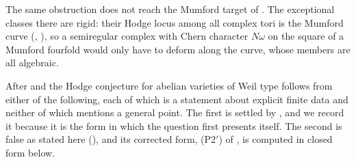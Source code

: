 \begin{remark}
The same obstruction does not reach the Mumford target of
. The exceptional classes there are rigid: their Hodge
locus among all complex tori is the Mumford curve (,
), so a semiregular complex with Chern character
$N\omega$ on the square of a Mumford fourfold would only have to deform along
the curve, whose members are all algebraic.
\end{remark}

\begin{remark}
\label{rem:tworemain}
After  and  the Hodge
conjecture for abelian varieties of Weil type follows from either of the
following, each of which is a statement about explicit finite data and neither
of which mentions a general point. The first is settled by
, and we record it because it is the form in which the
question first presents itself. The second is false as stated here
(), and its corrected form, \textup{(P2$'$)} of
, is computed in closed form below.


\end{remark}
